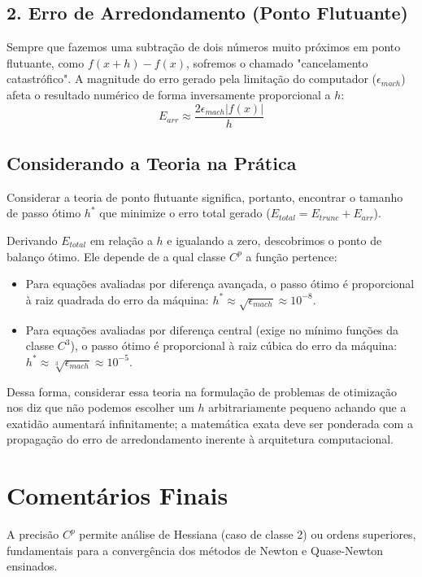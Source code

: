 \documentclass[preprint,12pt]{elsarticle}
\begin{document}
\subsection{2. Erro de Arredondamento (Ponto Flutuante)}
Sempre que fazemos uma subtra\c{c}\~ao de dois n\'umeros muito pr\'oximos em ponto flutuante, como $f(x+h) - f(x)$, sofremos o chamado "cancelamento catastr\'ofico". A magnitude do erro gerado pela limita\c{c}\~ao do computador ($\epsilon_{mach}$) afeta o resultado num\'erico de forma inversamente proporcional a $h$:
\begin{equation}
E_{arr} \approx \frac{2 \epsilon_{mach} |f(x)|}{h}
\end{equation}

\subsection{Considerando a Teoria na Pr\'atica}
Considerar a teoria de ponto flutuante significa, portanto, encontrar o tamanho de passo \'otimo $h^*$ que minimize o erro total gerado ($E_{total} = E_{trunc} + E_{arr}$).

Derivando $E_{total}$ em rela\c{c}\~ao a $h$ e igualando a zero, descobrimos o ponto de balan\c{c}o \'otimo. Ele depende de a qual classe $C^p$ a fun\c{c}\~ao pertence:

\begin{itemize}
    \item Para equa\c{c}\~oes avaliadas por diferen\c{c}a avan\c{c}ada, o passo \'otimo \'e proporcional \`a raiz quadrada do erro da m\'aquina: $h^* \approx \sqrt{\epsilon_{mach}} \approx 10^{-8}$.
    \item Para equa\c{c}\~oes avaliadas por diferen\c{c}a central (exige no m\'inimo fun\c{c}\~oes da classe $C^3$), o passo \'otimo \'e proporcional \`a raiz c\'ubica do erro da m\'aquina: $h^* \approx \sqrt[3]{\epsilon_{mach}} \approx 10^{-5}$.
\end{itemize}

Dessa forma, considerar essa teoria na formula\c{c}\~ao de problemas de otimiza\c{c}\~ao nos diz que não podemos escolher um $h$ arbitrariamente pequeno achando que a exatidão aumentará infinitamente; a matem\'atica exata deve ser ponderada com a propaga\c{c}\~ao do erro de arredondamento inerente \`a arquitetura computacional.

\appendix

\section{Coment\'arios Finais}
\label{sec:sample:appendix}
A precis\~ao $C^p$ permite an\'alise de Hessiana (caso de classe 2) ou ordens superiores, fundamentais para a converg\^encia dos m\'etodos de Newton e Quase-Newton ensinados.
\end{document}
